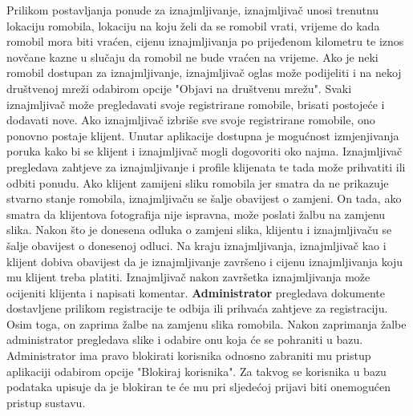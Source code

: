 		Prilikom postavljanja ponude za iznajmljivanje, iznajmljivač unosi trenutnu lokaciju romobila, lokaciju na koju želi da se romobil vrati, vrijeme do kada romobil mora biti vraćen, cijenu iznajmljivanja po prijeđenom kilometru te iznos novčane kazne u slučaju da romobil ne bude vraćen na vrijeme. Ako je neki romobil dostupan za iznajmljivanje, iznajmljivač oglas može podijeliti i na nekoj društvenoj mreži odabirom opcije "Objavi na društvenu mrežu". Svaki iznajmljivač može pregledavati svoje registrirane romobile, brisati postojeće i dodavati nove. Ako iznajmljivač izbriše sve svoje registrirane romobile, ono ponovno postaje klijent. Unutar aplikacije dostupna je mogućnost izmjenjivanja poruka kako bi se klijent i iznajmljivač mogli dogovoriti oko najma. Iznajmljivač pregledava zahtjeve za iznajmljivanje i profile klijenata te tada može prihvatiti ili odbiti ponudu. Ako klijent zamijeni sliku romobila jer smatra da ne prikazuje stvarno stanje romobila, iznajmljivaču se šalje obavijest o zamjeni. On tada, ako smatra da klijentova fotografija nije ispravna, može poslati žalbu na zamjenu slika. Nakon što je donesena odluka o zamjeni slika, klijentu i iznajmljivaču se šalje obavijest o donesenoj odluci. Na kraju iznajmljivanja, iznajmljivač kao i klijent dobiva obavijest da je iznajmljivanje završeno i cijenu iznajmljivanja koju mu klijent treba platiti. Iznajmljivač nakon završetka iznajmljivanja može ocijeniti klijenta i napisati komentar. \textbf{Administrator} pregledava dokumente dostavljene prilikom registracije te odbija ili prihvaća zahtjeve za registraciju. Osim toga, on zaprima žalbe na zamjenu slika romobila. Nakon zaprimanja žalbe administrator pregledava slike i odabire onu koja će se pohraniti u bazu. Administrator  ima pravo blokirati korisnika odnosno zabraniti mu pristup aplikaciji odabirom opcije "Blokiraj korisnika". Za takvog se korisnika u bazu podataka upisuje da je blokiran te će mu pri sljedećoj prijavi biti onemogućen pristup sustavu. 
		\newline
		\newline
		
		
		
		
		
		
		
	